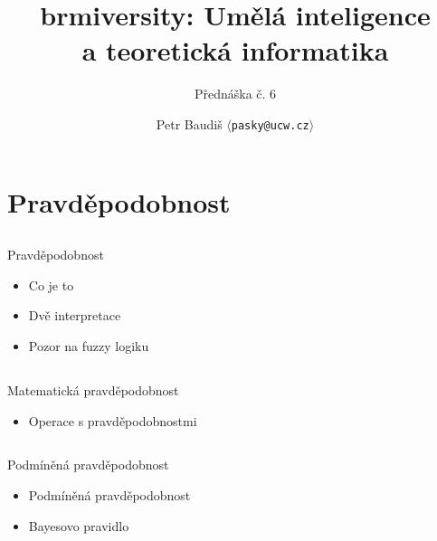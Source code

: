 \documentclass{beamer}
\begin{document}

\title{brmiversity: Umělá inteligence \\ a teoretická informatika}
\subtitle{Přednáška č. 6}
\author{Petr Baudiš $\langle${\tt pasky@ucw.cz}$\rangle$}
\date{}
\frame{\titlepage}

\section{Pravděpodobnost}

\subsection{}
\begin{frame}{Pravděpodobnost}
\begin{itemize}
\item Co je to
\item Dvě interpretace
\item Pozor na fuzzy logiku
\end{itemize}
\end{frame}

\subsection{}
\begin{frame}{Matematická pravděpodobnost}
\begin{itemize}
\item Operace s pravděpodobnostmi
\end{itemize}
\end{frame}

\subsection{}
\begin{frame}{Podmíněná pravděpodobnost}
\begin{itemize}
\item Podmíněná pravděpodobnost
\item Bayesovo pravidlo
\end{itemize}
\end{frame}
\end{document}
